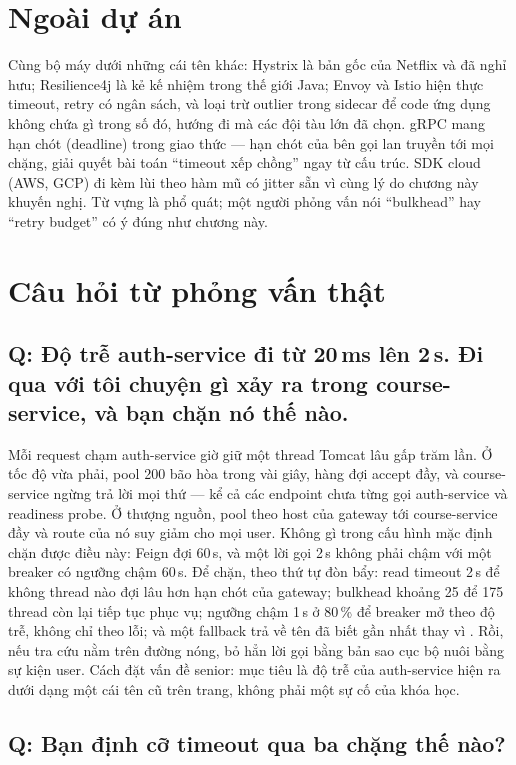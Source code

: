 \section{Ngoài dự án}

Cùng bộ máy dưới những cái tên khác: Hystrix là bản gốc của Netflix và
đã nghỉ hưu; Resilience4j là kẻ kế nhiệm trong thế giới Java; Envoy và
Istio hiện thực timeout, retry có ngân sách, và loại trừ outlier trong
sidecar để code ứng dụng không chứa gì trong số đó, hướng đi mà các đội
tàu lớn đã chọn. gRPC mang hạn chót (deadline) trong giao thức --- hạn
chót của bên gọi lan truyền tới mọi chặng, giải quyết bài toán
``timeout xếp chồng'' ngay từ cấu trúc. SDK cloud (AWS, GCP) đi kèm lùi
theo hàm mũ có jitter sẵn vì cùng lý do chương này khuyến nghị. Từ vựng
là phổ quát; một người phỏng vấn nói ``bulkhead'' hay ``retry budget''
có ý đúng như chương này.

\section{Câu hỏi từ phỏng vấn thật}

\subsection*{Q: Độ trễ auth-service đi từ 20\,ms lên 2\,s. Đi qua với tôi chuyện gì xảy ra trong course-service, và bạn chặn nó thế nào.}

Mỗi request chạm auth-service giờ giữ một thread Tomcat lâu gấp trăm
lần. Ở tốc độ vừa phải, pool 200 bão hòa trong vài giây, hàng đợi
accept đầy, và course-service ngừng trả lời mọi thứ --- kể cả các
endpoint chưa từng gọi auth-service và readiness probe. Ở thượng nguồn,
pool theo host của gateway tới course-service đầy và route của nó suy
giảm cho mọi user. Không gì trong cấu hình mặc định chặn được điều này:
Feign đợi 60\,s, và một lời gọi 2\,s không phải chậm với một breaker có
ngưỡng chậm 60\,s. Để chặn, theo thứ tự đòn bẩy: read timeout 2\,s để
không thread nào đợi lâu hơn hạn chót của gateway; bulkhead khoảng 25
để 175 thread còn lại tiếp tục phục vụ; ngưỡng chậm 1\,s ở 80\,\% để
breaker mở theo độ trễ, không chỉ theo lỗi; và một fallback trả về tên
đã biết gần nhất thay vì . Rồi, nếu tra cứu nằm trên đường
nóng, bỏ hẳn lời gọi bằng bản sao cục bộ nuôi bằng sự kiện user. Cách
đặt vấn đề senior: mục tiêu là độ trễ của auth-service hiện ra dưới
dạng một cái tên cũ trên trang, không phải một sự cố của khóa học.

\subsection*{Q: Bạn định cỡ timeout qua ba chặng thế nào?}

